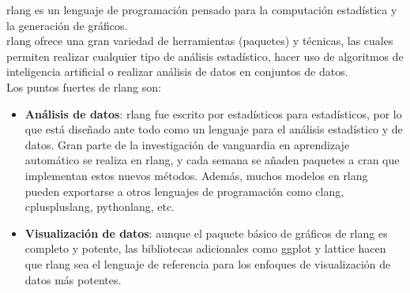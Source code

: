 \documentclass[../../main.tex]{subfiles}
\begin{document}
\gls{rlang}\cite{doc16} es un lenguaje de programación pensado para la computación estadística y la generación de gráficos.  \\

\gls{rlang} ofrece una gran variedad de herramientas (paquetes) y técnicas, las cuales permiten realizar cualquier tipo de análisis estadístico, hacer uso de algoritmos de inteligencia artificial o realizar análisis de datos en conjuntos de datos.  \\

Los puntos fuertes de \gls{rlang} son:
\begin{itemize}
    \item \textbf{Análisis de datos}: \gls{rlang} fue escrito por estadísticos para estadísticos, por lo que está diseñado ante todo como un lenguaje para el análisis estadístico y de datos. Gran parte de la investigación de vanguardia en aprendizaje automático se realiza en \gls{rlang}, y cada semana se añaden paquetes a \gls{cran} que implementan estos nuevos métodos. Además, muchos modelos en \gls{rlang} pueden exportarse a otros lenguajes de programación como \gls{clang}, \gls{cpluspluslang}, \Gls{pythonlang}, etc.
    
    \item \textbf{Visualización de datos}: aunque el paquete básico de gráficos de \gls{rlang} es completo y potente, las bibliotecas adicionales como \gls{ggplot} y \gls{lattice} hacen que \gls{rlang} sea el lenguaje de referencia para los enfoques de visualización de datos más potentes.
\end{itemize}
\end{document}
